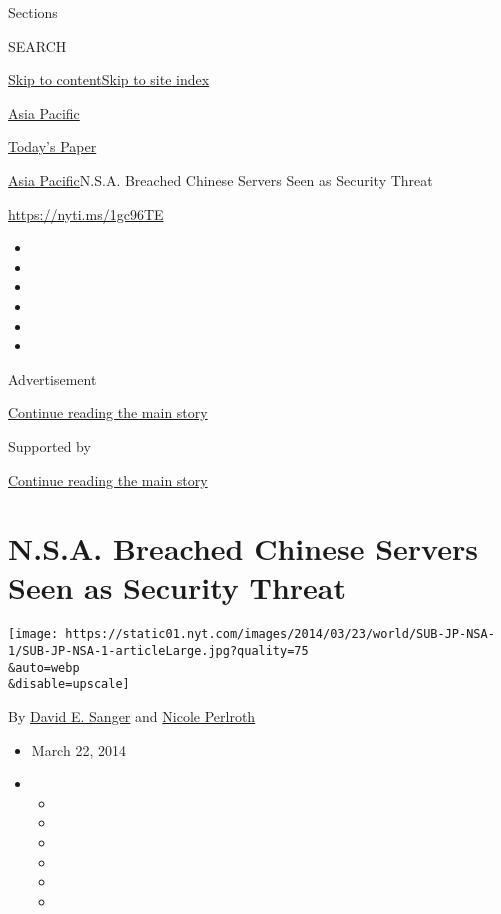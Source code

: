 Sections

SEARCH

\protect\hyperlink{site-content}{Skip to
content}\protect\hyperlink{site-index}{Skip to site index}

\href{https://www.nytimes.com/section/world/asia}{Asia Pacific}

\href{https://myaccount.nytimes.com/auth/login?response_type=cookie\&client_id=vi}{}

\href{https://www.nytimes.com/section/todayspaper}{Today's Paper}

\href{/section/world/asia}{Asia Pacific}\textbar{}N.S.A. Breached
Chinese Servers Seen as Security Threat

\url{https://nyti.ms/1gc96TE}

\begin{itemize}
\item
\item
\item
\item
\item
\item
\end{itemize}

Advertisement

\protect\hyperlink{after-top}{Continue reading the main story}

Supported by

\protect\hyperlink{after-sponsor}{Continue reading the main story}

\hypertarget{nsa-breached-chinese-servers-seen-as-security-threat}{%
\section{N.S.A. Breached Chinese Servers Seen as Security
Threat}\label{nsa-breached-chinese-servers-seen-as-security-threat}}

\texttt{[image: https://static01.nyt.com/images/2014/03/23/world/SUB-JP-NSA-1/SUB-JP-NSA-1-articleLarge.jpg?quality=75\\\&auto=webp\\\&disable=upscale]}

By \href{http://www.nytimes.com/by/david-e-sanger}{David E. Sanger} and
\href{http://www.nytimes.com/by/nicole-perlroth}{Nicole Perlroth}

\begin{itemize}
\item
  March 22, 2014
\item
  \begin{itemize}
  \item
  \item
  \item
  \item
  \item
  \item
  \end{itemize}
\end{itemize}

